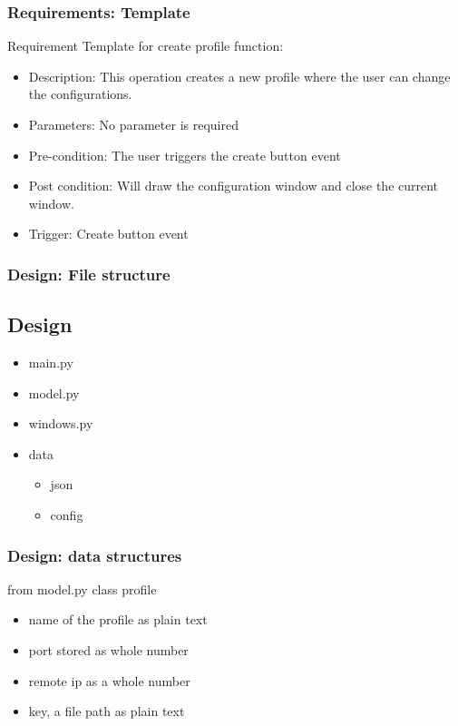 \documentclass[9pt]{beamer}
\begin{document}
\begin{frame}
\frametitle{Requirements: Template}
	Requirement Template for create profile function:
	\begin{itemize}
		\item Description: This operation creates a new profile where
		the user can change the configurations. 
		\item Parameters: No parameter is required 
		\item Pre-condition: The user triggers the create button event 
		\item Post condition: Will draw the configuration window and
			close the current window.
		\item Trigger: Create button event
	\end{itemize}
\end{frame}

\begin{frame}
\frametitle{Design: File structure}
\subsection{Design}
\begin{itemize}
\item main.py
\item model.py
\item windows.py
\item data
\begin{itemize}
\item json
\item config
\end{itemize}
\end{itemize}
\end{frame}

\begin{frame}
\frametitle{Design: data structures}
	from model.py class profile
	\begin{itemize}
	\item name of the profile as plain text
	\item port stored as whole number
	\item remote ip as a whole number
	\item key, a file path as plain text
	\end{itemize}
\end{frame}
\end{document}
